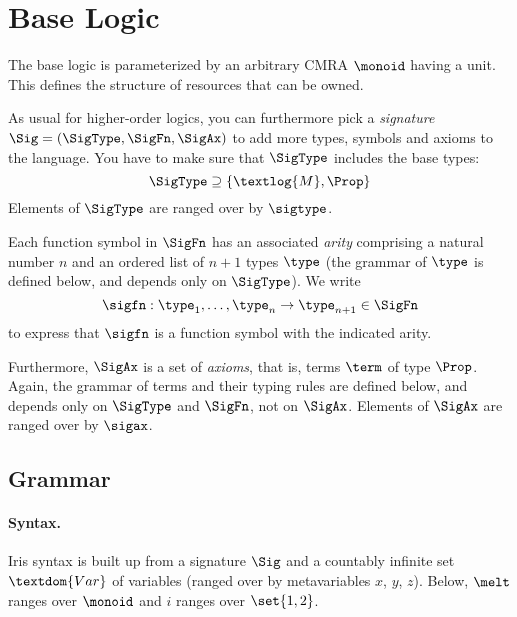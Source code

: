 \section{Base Logic}
\label{sec:base-logic}

The base logic is parameterized by an arbitrary CMRA $\monoid$ having a unit.
This defines the structure of resources that can be owned.

As usual for higher-order logics, you can furthermore pick a \emph{signature} $\Sig = (\SigType, \SigFn, \SigAx)$ to add more types, symbols and axioms to the language.
You have to make sure that $\SigType$ includes the base types:
\[
	\SigType \supseteq \{ \textlog{M}, \Prop \}
\]
Elements of $\SigType$ are ranged over by $\sigtype$.

Each function symbol in $\SigFn$ has an associated \emph{arity} comprising a natural number $n$ and an ordered list of $n+1$ types $\type$ (the grammar of $\type$ is defined below, and depends only on $\SigType$).
We write
\[
	\sigfn : \type_1, \dots, \type_n \to \type_{n+1} \in \SigFn
\]
to express that $\sigfn$ is a function symbol with the indicated arity.

Furthermore, $\SigAx$ is a set of \emph{axioms}, that is, terms $\term$ of type $\Prop$.
Again, the grammar of terms and their typing rules are defined below, and depends only on $\SigType$ and $\SigFn$, not on $\SigAx$.
Elements of $\SigAx$ are ranged over by $\sigax$.

\subsection{Grammar}\label{sec:grammar}

\paragraph{Syntax.}
Iris syntax is built up from a signature $\Sig$ and a countably infinite set $\textdom{Var}$ of variables (ranged over by metavariables $x$, $y$, $z$).
Below, $\melt$ ranges over $\monoid$ and $i$ ranges over $\set{1,2}$.

